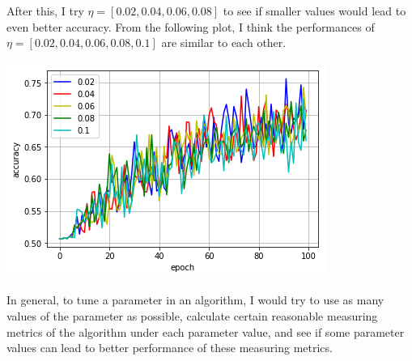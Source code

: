 \documentclass[paper=letter, fontsize=12pt]{article}
\begin{document}
\begin{enumerate}
\begin{enumerate}
	After this, I try $\eta = [0.02, 0.04, 0.06, 0.08]$ to see if smaller values would lead to even better accuracy. From the following plot, I think the performances of $\eta = [0.02, 0.04, 0.06, 0.08, 0.1]$ are similar to each other.
	
	\includegraphics[scale=0.5]{p2q2b2.png}
	
	In general, to tune a parameter in an algorithm, I would try to use as many values of the parameter as possible, calculate certain reasonable measuring metrics of the algorithm under each parameter value, and see if some parameter values can lead to better performance of these measuring metrics.
\end{enumerate}
\end{enumerate}
\end{document}
